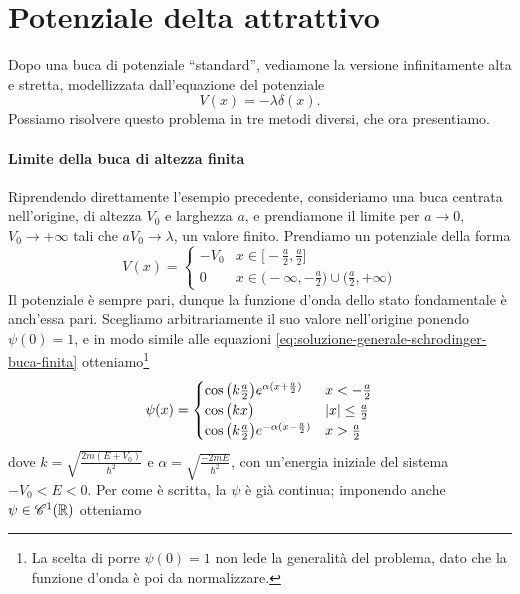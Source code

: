 \section{Potenziale delta attrattivo}
Dopo una buca di potenziale ``standard'', vediamone la versione infinitamente alta e stretta, modellizzata dall'equazione del potenziale
\begin{equation}
	V(x)=-\lambda\delta(x).
	\label{eq:potenziale-delta-attrattivo}
\end{equation}
Possiamo risolvere questo problema in tre metodi diversi, che ora presentiamo.
\paragraph{Limite della buca di altezza finita}
Riprendendo direttamente l'esempio precedente, consideriamo una buca centrata nell'origine, di altezza $V_0$ e larghezza $a$, e prendiamone il limite per $a\to 0$, $V_0\to+\infty$ tali che $aV_0\to\lambda$, un valore finito.
Prendiamo un potenziale della forma
\begin{equation}
	V(x)=
	\begin{cases}
		-V_0	&x\in\big[-\frac{a}2,\frac{a}2\big]\\
		0		&x\in\big(-\infty,-\frac{a}2\big)\cup\big(\frac{a}2,+\infty\big)
	\end{cases}
\end{equation}
Il potenziale è sempre pari, dunque la funzione d'onda dello stato fondamentale è anch'essa pari.
Scegliamo arbitrariamente il suo valore nell'origine ponendo $\psi(0)=1$, e in modo simile alle equazioni \eqref{eq:soluzione-generale-schrodinger-buca-finita} otteniamo\footnote{La scelta di porre $\psi(0)=1$ non lede la generalità del problema, dato che la funzione d'onda è poi da normalizzare.}
\begin{equation}
	\psi(x)=
	\begin{cases}
		\cos\big(k\frac{a}2\big)e^{\alpha(x+\frac{a}2)}		&x<-\frac{a}2\\
		\cos\big(kx\big)									&\left|{x}\right|\le\frac{a}2\\
		\cos\big(k\frac{a}2\big)e^{-\alpha(x-\frac{a}2)}	&x>\frac{a}2
	\end{cases}
	\label{eq:soluzione-generale-delta-attrattivo}
\end{equation}
dove $k=\sqrt{\frac{2m(E+V_0)}{\hbar^2}}$ e $\alpha=\sqrt{\frac{-2mE}{\hbar^2}}$, con un'energia iniziale del sistema $-V_0<E<0$.
Per come è scritta, la $\psi$ è già continua; imponendo anche $\psi\in\mathscr{C}^{{1}}(\mathbb{R})$ otteniamo
